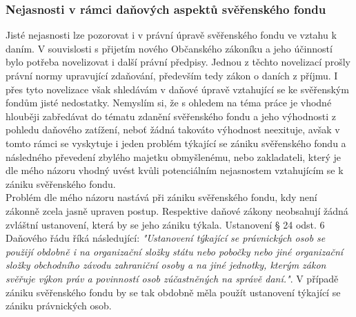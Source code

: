 \documentclass{article}
\begin{document}

\subsubsection{Nejasnosti v rámci daňových aspektů svěřenského fondu}


Jisté nejasnosti lze pozorovat i v právní úpravě svěřenského fondu ve vztahu k daním. V souvislosti s přijetím nového Občanského zákoníku a jeho účinností bylo potřeba novelizovat i další právní předpisy. Jednou z těchto novelizací prošly právní normy upravující zdaňování, především tedy zákon o daních z příjmu. I přes tyto novelizace však shledávám v daňové úpravě vztahující se ke svěřenským fondům jisté nedostatky. Nemyslím si, že s ohledem na téma práce je vhodné hlouběji zabředávat do tématu zdanění svěřenského fondu a jeho výhodnosti z pohledu daňového zatížení, neboť žádná takováto výhodnost neexituje, avšak v tomto rámci se vyskytuje i jeden problém týkající se zániku svěřenského fondu a následného převedení zbylého majetku obmyšlenému, nebo zakladateli, který je dle mého názoru vhodný uvést kvůli potenciálním nejasnostem vztahujícím se k zániku svěřenského fondu.\\


Problém dle mého názoru nastává při zániku svěřenského fondu, kdy není zákonně zcela jasně upraven postup. Respektive daňové zákony neobsahují žádná zvláštní ustanovení, která by se jeho zániku týkala. Ustanovení § 24 odst. 6 Daňového řádu říká následující: \textit{"Ustanovení týkající se právnických osob se použijí obdobně i na organizační složky státu nebo pobočky nebo jiné organizační složky obchodního závodu zahraniční osoby a na jiné jednotky, kterým zákon svěřuje výkon práv a povinností osob zúčastněných na správě daní."}. V případě zániku svěřenského fondu by se tak obdobně měla použít ustanovení týkající se zániku právnických osob.\\
\end{document}
